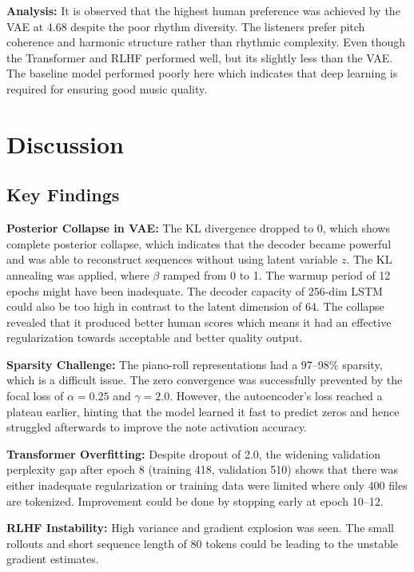 \documentclass[conference]{IEEEtran}
\begin{document}
\textbf{Analysis:} It is observed that the highest human preference was achieved by the VAE at 4.68 despite the poor rhythm diversity. The listeners prefer pitch coherence and harmonic structure rather than rhythmic complexity. Even though the Transformer and RLHF performed well, but its slightly less than the VAE. The baseline model performed poorly here which indicates that deep learning is required for ensuring good music quality.

\section{Discussion}

\subsection{Key Findings}

\textbf{Posterior Collapse in VAE:} The KL divergence dropped to 0, which shows complete posterior collapse, which indicates that the decoder became powerful and was able to reconstruct sequences without using latent variable $z$. The KL annealing was applied, where $\beta$ ramped from 0 to 1. The warmup period of 12 epochs might have been inadequate. The decoder capacity of 256-dim LSTM could also be too high in contrast to the latent dimension of 64. The collapse revealed that it produced better human scores which means it had an effective regularization towards acceptable and better quality output.

\textbf{Sparsity Challenge:} The piano-roll representations had a 97--98\% sparsity, which is a difficult issue. The zero convergence was successfully prevented by the focal loss of $\alpha=0.25$ and $\gamma=2.0$. However, the autoencoder's loss reached a plateau earlier, hinting that the model learned it fast to predict zeros and hence struggled afterwards to improve the note activation accuracy.

\textbf{Transformer Overfitting:} Despite dropout of 2.0, the widening validation perplexity gap after epoch 8 (training 418, validation 510) shows that there was either inadequate regularization or training data were limited where only 400 files are tokenized. Improvement could be done by stopping early at epoch 10--12.

\textbf{RLHF Instability:} High variance and gradient explosion was seen. The small rollouts and short sequence length of 80 tokens could be leading to the unstable gradient estimates.
\end{document}
